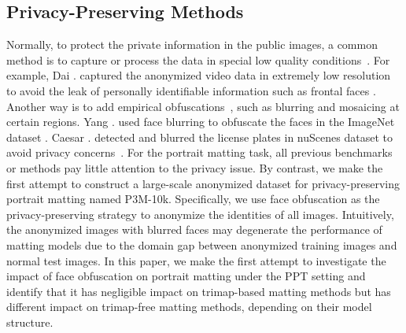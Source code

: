 \documentclass[sigconf]{acmart}
\begin{document}
\subsection{Privacy-Preserving Methods}

Normally, to protect the private information in the public images, a common method is to capture or process the data in special low quality conditions~\cite{dai2015towards,butler2015privacy}. For example, Dai . captured the anonymized video data in extremely low resolution to avoid the leak of personally identifiable information such as frontal faces \cite{dai2015towards}. Another way is to add empirical obfuscations~\cite{uittenbogaard2019privacy,caesar2020nuscenes,frome2009large}, such as blurring and mosaicing at certain regions. Yang . used face blurring to obfuscate the faces in the ImageNet dataset \cite{yang2021study}. Caesar . detected and blurred the license plates in nuScenes dataset to avoid privacy concerns~\cite{caesar2020nuscenes}. For the portrait matting task, all previous benchmarks or methods pay little attention to the privacy issue. By contrast, we make the first attempt to construct a large-scale anonymized dataset for privacy-preserving portrait matting named P3M-10k. Specifically, we use face obfuscation as the privacy-preserving strategy to anonymize the identities of all images. Intuitively, the anonymized images with blurred faces may degenerate the performance of matting models due to the domain gap between anonymized training images and normal test images. In this paper, we make the first attempt to investigate the impact of face obfuscation on portrait matting under the PPT setting and identify that it has negligible impact on trimap-based matting methods but has different impact on trimap-free matting methods, depending on their model structure.
\end{document}
